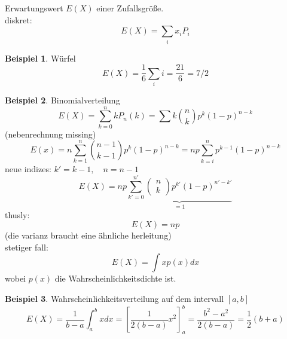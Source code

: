 \documentclass[a4paper]{article}
\theoremstyle{definition}
\newtheorem{beispiel}{Beispiel}%
\theoremstyle{remark}
\begin{document}
  Erwartungswert $E(X)$ einer Zufallsgröße. \\
  diskret:
  \begin{equation*}
  E(X)=\sum_i x_iP_i
  \end{equation*}
  \begin{beispiel}
    Würfel\\
    \begin{equation*}
  E(X)= \frac{1}{6}\sum_i i=\frac{21}{6}=7/2
    \end{equation*}
  \end{beispiel}
  \begin{beispiel}
    Binomialverteilung\\
    \begin{equation*}
    E(X)=  \sum_{k=0}^{n}kP_n(k)=\sum k \binom{n}{k}p^k(1-p)^{n-k}
    \end{equation*}
(nebenrechnung missing)\\
\begin{equation*}
E(x)=n\sum_{k=1}^n \binom {n-1}{k-1}p^k(1-p)^{n-k}=np\sum_{k=i}^n p^{k-1}(1-p)^{n-k}
\end{equation*}
  neue indizes: $k'=k-1,\quad n=n-1$\\
  \begin{equation*}
  E(X)= np   
  \underbrace{\sum_{k'=0}^{n'} \begin{pmatrix}
  n\\k
  \end{pmatrix}p^{k'}(1-p)^{n'-k'}}_{=1}
  \end{equation*}
  thusly:\\
  \begin{equation*}
  E(X)=np
  \end{equation*}
  (die varianz braucht eine ähnliche herleitung)\\
  stetiger fall:\\
  \begin{equation*}
  E(X)= \int xp(x)dx
  \end{equation*}
  wobei $p(x)$ die Wahrscheinlichkeitsdichte ist.

  \end{beispiel}
  \begin{beispiel}
   Wahrscheinlichkeitsverteilung auf dem intervall $[a,b]$ \\
  \begin{equation}
    E(X)= \frac{1}{b-a}\int_a^b xdx= \left[  \frac{1}{2(b-a)}x^2 \right]_a^b=\frac{b^2-a^2}{2(b-a)}=\frac{1}{2} (b+a)
  \end{equation}
\end{beispiel}
\end{document}
